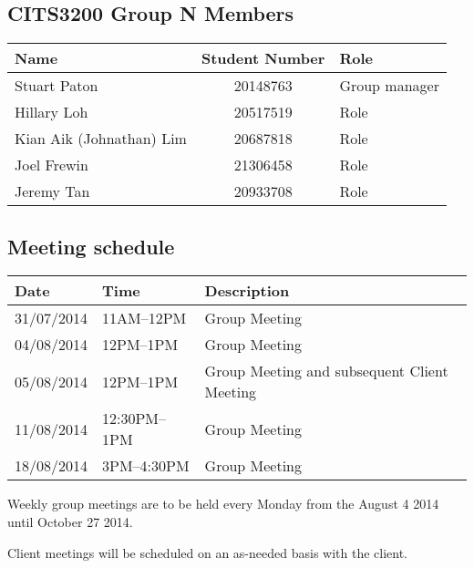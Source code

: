 \documentclass[a4paper, 11pt, titlepage]{article}
\begin{document}
\subsection*{CITS3200 Group N Members}
\begin{table}[H]
\centering
\begin{tabular}{lcl}
	\hline
	Name & Student Number & Role \\
	\hline
	Stuart Paton & 20148763  & Group manager\\
	Hillary Loh & 20517519 & Role\\
	Kian Aik (Johnathan) Lim & 20687818 & Role \\
	Joel Frewin & 21306458 & Role\\
	Jeremy Tan & 20933708 & Role\\
\end{tabular}
\end{table}


\pagebreak


\subsection*{Meeting schedule}
\begin{table}[H]
\begin{tabularx}{\textwidth}{lll}
\hline
Date & Time & Description \\
\hline
31/07/2014 & 11AM--12PM & Group Meeting \\
04/08/2014 & 12PM--1PM & Group Meeting \\
05/08/2014 & 12PM--1PM & Group Meeting and subsequent Client Meeting \\
11/08/2014 & 12:30PM--1PM & Group Meeting \\
18/08/2014 & 3PM--4:30PM & Group Meeting

\end{tabularx}
\end{table}

Weekly group meetings are to be held every Monday from the August 4 2014 until October 27 2014. 

Client meetings will be scheduled on an as-needed basis with the client.

\pagebreak

\begingroup
\linespread{0.7}
\hypersetup{linkcolor=black}
\tableofcontents
\endgroup
\end{document}
